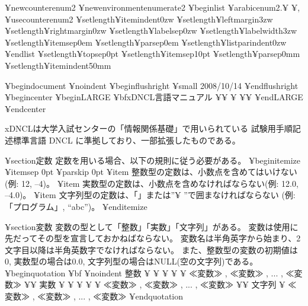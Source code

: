 
¥newcounter{enum2}
¥newenvironment{enumerate2}{%
   ¥begin{list}%
   {%
      ¥arabic{enum2}.¥ ¥,%
   }%
   {%
      ¥usecounter{enum2}
      ¥setlength{¥itemindent}{0zw}%
      ¥setlength{¥leftmargin}{3zw}%
      ¥setlength{¥rightmargin}{0zw}%
      ¥setlength{¥labelsep}{0zw}%
      ¥setlength{¥labelwidth}{3zw}%
      ¥setlength{¥itemsep}{0em}%
      ¥setlength{¥parsep}{0em}%
      ¥setlength{¥listparindent}{0zw}%
   }
}{%
   ¥end{list}%
}
¥setlength{¥topsep}{0pt}
¥setlength{¥itemsep}{10pt}
¥setlength{¥parsep}{0mm}
¥setlength{¥itemindent}{50mm}

¥begin{document}
¥noindent
¥begin{flushright}
{¥small	2008/10/14}
¥end{flushright}
¥begin{center}
¥begin{LARGE}
{¥bf{xDNCL言語マニュアル }}¥¥
¥ ¥¥
¥end{LARGE}
¥end{center}

xDNCLは大学入試センターの「情報関係基礎」で用いられている
試験用手順記述標準言語 DNCL に準拠しており、一部拡張したものである。

¥section{定数}
定数を用いる場合、以下の規則に従う必要がある。
¥begin{itemize}
¥itemsep 0pt  ¥parskip 0pt
¥item	整数型の定数は、小数点を含めてはいけない(例: 12, --4)。
¥item	実数型の定数は、小数点を含めなければならない(例: 12.0,  --4.0)。
¥item	文字列型の定数は、「」または''¥ ''で囲まなければならない
        (例: 「プログラム」, ``abc'')。
¥end{itemize}

¥section{変数}
変数の型として「整数」「実数」「文字列」がある。
変数は使用に先だってその型を宣言しておかねばならない。
変数名は半角英字から始まり、2文字目以降は半角英数字でなければならない。
また、整数型の変数の初期値は0, 実数型の場合は0.0, 
文字列型の場合はNULL(空の文字列)である。
%
¥begin{quotation}
{¥bf{
¥noindent 整数 ¥ ¥ ¥ ¥ ¥ ≪変数≫ , ≪変数≫ , ... , ≪変数≫ ¥¥
実数 ¥ ¥ ¥ ¥ ¥ ≪変数≫ , ≪変数≫ , ... , ≪変数≫ ¥¥
文字列 ¥ ≪変数≫ , ≪変数≫ , ... , ≪変数≫
}}
¥end{quotation}

